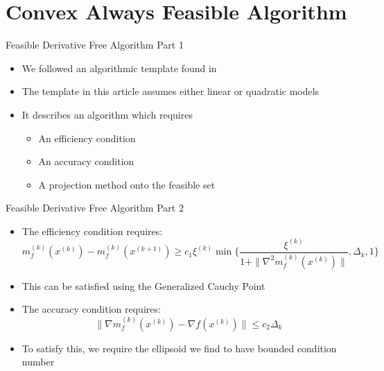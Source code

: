 \documentclass{beamer}
\begin{document}
\section{Convex Always Feasible Algorithm}


\begin{frame}{Feasible Derivative Free Algorithm Part 1}
    \begin{itemize}
        \item We followed an algorithmic template found in \cite{CONEJO2013324}
        \item The template in this article assumes either linear or quadratic models
        \item It describes an algorithm which requires
            \begin{itemize}
                \item An efficiency condition
                \item An accuracy condition
                \item A projection method onto the feasible set
            \end{itemize}
    \end{itemize}
\end{frame}



\begin{frame}{Feasible Derivative Free Algorithm Part 2}
    \begin{itemize}
        \item The efficiency condition requires: $$m_f^{(k)}(x^{(k)}) - m_f^{(k)}(x^{(k+1)}) \ge c_1 \xi^{(k)} \min \{\frac{\xi^{(k)}}{1 + \|\nabla^2 m_f^{(k)}(x^{(k)})\|}, \Delta_k, 1\}$$
        \item This can be satisfied using the Generalized Cauchy Point
        \item The accuracy condition requires: $$\|\nabla m_f^{(k)}(x^{(k)}) - \nabla f (x^{(k)})\| \le c_2 \Delta_k$$
        \item To satisfy this, we require the ellipsoid we find to have bounded condition number
    \end{itemize}
\end{frame}
\end{document}
